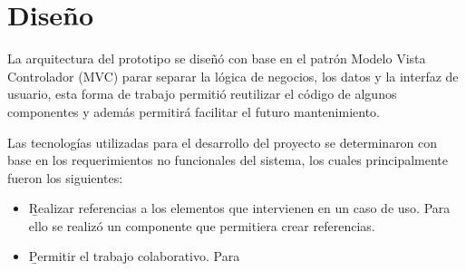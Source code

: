 \section{Diseño}
La arquitectura del prototipo se diseñó con base en el patrón Modelo Vista Controlador (MVC) parar separar la lógica de negocios, los datos y la interfaz de usuario, esta forma de trabajo permitió reutilizar el código de algunos componentes y además permitirá facilitar el futuro mantenimiento.

Las tecnologías utilizadas para el desarrollo del proyecto se determinaron con base en los requerimientos no funcionales del sistema, los cuales principalmente fueron los siguientes:

	\begin{itemize}
		\item {\b Realizar referencias a los elementos que intervienen en un caso de uso.} Para ello se realizó un componente que permitiera crear referencias.
		\item {\b Permitir el trabajo colaborativo.} Para  
	\end{itemize}
	
